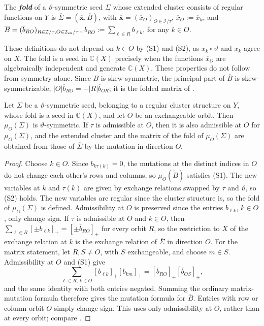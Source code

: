 \documentclass[a4paper]{amsart}
\numberwithin{equation}{section}
\theoremstyle{definition}
\theoremstyle{remark}
\newcommand{\bbC}{\mathbb{C}}
\newcommand{\mcI}{\mathcal{I}}
\newcommand{\bx}{\mathbf{x}}
\newcommand{\tB}{\widetilde{B}}
\newcommand{\vt}{\vartheta}
\newcommand{\ex}{{\rm ex}}
\newcommand{\newword}[1]{\textbf{\emph{#1}}}
\begin{document}
\begin{definition}
  \label{def: fold}
  The \newword{fold} of a $\vt$-symmetric seed $\Sigma$ whose extended cluster consists of regular functions on $Y$ is $\overline{\Sigma}=(\overline{\bx},\overline{B})$, with $\overline{\bx}=(\overline{x}_O)_{O\in\mcI/\tau}$, $\overline{x}_O:=\overline{x}_k$, and $\overline{B}=(\overline{b}_{RO})_{R\in\mcI/\tau,O\in\mcI_\ex/\tau}$, $\overline{b}_{RO}:=\sum_{\ell\in R}b_{\ell k}$, for any $k\in O$.
\end{definition}

These definitions do not depend on $k\in O$ by (S1) and (S2), as $x_k\circ\vt$ and $x_k$ agree on $X$.
The fold is a seed in $\bbC(X)$ precisely when the functions $\overline{x}_O$ are algebraically independent and generate $\bbC(X)$. These properties do not follow from symmetry alone.
Since $B$ is skew-symmetric, the principal part of $\overline{B}$ is skew-symmetrizable, $|O|\overline{b}_{RO}=-|R|\overline{b}_{OR}$; it is the folded matrix of \cite[(5.5)]{NS14}.

\begin{proposition}
  \label{prop: fold mutation}
  Let $\Sigma$ be a $\vt$-symmetric seed, belonging to a regular cluster structure on $Y$, whose fold is a seed in $\bbC(X)$, and let $O$ be an exchangeable orbit.
  Then $\mu_O(\Sigma)$ is $\vt$-symmetric.
  If $\tau$ is admissible at $O$, then it is also admissible at $O$ for $\mu_O(\Sigma)$, and the extended cluster and the matrix of the fold of $\mu_O(\Sigma)$ are obtained from those of $\overline{\Sigma}$ by the mutation in direction $O$.
\end{proposition}
\begin{proof}
  Choose $k\in O$. Since $b_{k\tau(k)}=0$, the mutations at the distinct indices in $O$ do not change each other's rows and columns, so $\mu_O(\tB)$ satisfies (S1).
  The new variables at $k$ and $\tau(k)$ are given by exchange relations swapped by $\tau$ and $\vt$, so (S2) holds. The new variables are regular since the cluster structure is, so the fold of $\mu_O(\Sigma)$ is defined.
  Admissibility at $O$ is preserved since the entries $b_{\ell k}$, $k\in O$, only change sign.
  If $\tau$ is admissible at $O$ and $k\in O$, then $\sum_{\ell\in R}[\pm b_{\ell k}]_+=[\pm\overline{b}_{RO}]_+$ for every orbit $R$, so the restriction to $X$ of the exchange relation at $k$ is the exchange relation of $\overline{\Sigma}$ in direction $O$.
  For the matrix statement, let $R,S\neq O$, with $S$ exchangeable, and choose $m\in S$.
  Admissibility at $O$ and (S1) give
  \[
    \sum_{\ell\in R,\,k\in O}[b_{\ell k}]_+[b_{km}]_+
      =[\overline{b}_{RO}]_+[\overline{b}_{OS}]_+,
  \]
  and the same identity with both entries negated.
  Summing the ordinary matrix-mutation formula therefore gives the mutation formula for $\overline{B}$. Entries with row or column orbit $O$ simply change sign.
  This uses only admissibility at $O$, rather than at every orbit; compare \cite[proof of Theorem~2.24]{Dup08}.
\end{proof}
\end{document}
